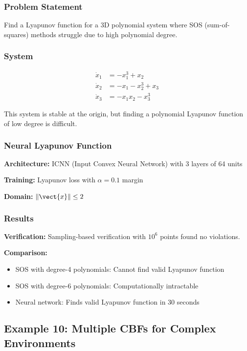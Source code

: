 \subsubsection{Problem Statement}

Find a Lyapunov function for a 3D polynomial system where SOS (sum-of-squares) methods struggle due to high polynomial degree.

\subsubsection{System}

\begin{align}
\dot{x}_1 &= -x_1^3 + x_2 \\
\dot{x}_2 &= -x_1 - x_2^3 + x_3 \\
\dot{x}_3 &= -x_1 x_2 - x_3^3
\end{align}

This system is stable at the origin, but finding a polynomial Lyapunov function of low degree is difficult.

\subsubsection{Neural Lyapunov Function}

\textbf{Architecture:} ICNN (Input Convex Neural Network) with 3 layers of 64 units

\textbf{Training:} Lyapunov loss with $\alpha = 0.1$ margin

\textbf{Domain:} $\|\vect{x}\| \leq 2$

\subsubsection{Results}

\textbf{Verification:} Sampling-based verification with $10^6$ points found no violations.

\textbf{Comparison:}
\begin{itemize}
    \item SOS with degree-4 polynomials: Cannot find valid Lyapunov function
    \item SOS with degree-6 polynomials: Computationally intractable
    \item Neural network: Finds valid Lyapunov function in 30 seconds
\end{itemize}

\subsection{Example 10: Multiple CBFs for Complex Environments}
\label{ex:multiple_cbf}

